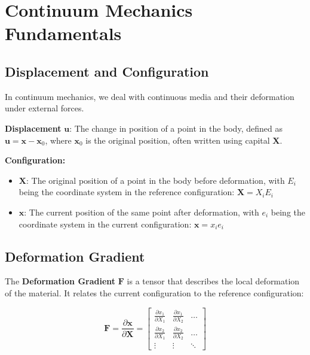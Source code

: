 \documentclass[
  11pt,
  a4paper,
]{scrbook}
\begin{document}
\chapter{Continuum Mechanics
Fundamentals}\label{continuum-mechanics-fundamentals}

\section{Displacement and
Configuration}\label{displacement-and-configuration}

In continuum mechanics, we deal with continuous media and their
deformation under external forces.

\textbf{Displacement} \(\mathbf{u}\): The change in position of a point
in the body, defined as \(\mathbf{u} = \mathbf{x} - \mathbf{x}_0\),
where \(\mathbf{x}_0\) is the original position, often written using
capital \(\mathbf{X}\).

\textbf{Configuration:}

\begin{itemize}
\item
  \(\mathbf{X}\): The original position of a point in the body before
  deformation, with \(E_i\) being the coordinate system in the reference
  configuration: \(\mathbf{X}=X_iE_i\)
\item
  \(\mathbf{x}\): The current position of the same point after
  deformation, with \(e_i\) being the coordinate system in the current
  configuration: \(\mathbf{x}=x_ie_i\)
\end{itemize}

\section{Deformation Gradient}\label{deformation-gradient}

The \textbf{Deformation Gradient} \(\mathbf{F}\) is a tensor that
describes the local deformation of the material. It relates the current
configuration to the reference configuration:

\[\mathbf{F} = \frac{\partial \mathbf{x}}{\partial \mathbf{X}} = \begin{bmatrix} \frac{\partial x_1}{\partial X_1} & \frac{\partial x_1}{\partial X_2} & \ldots \\ \frac{\partial x_2}{\partial X_1} & \frac{\partial x_2}{\partial X_2} & \ldots \\ \vdots & \vdots & \ddots \end{bmatrix}\]
\end{document}
